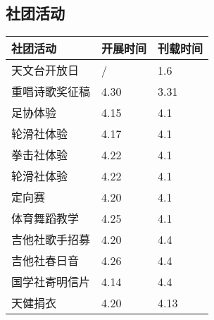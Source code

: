 \documentclass[letterpaper, 12pt]{article}
\begin{document}
\begin{multicols}{2}
\section{社团活动}
\begin{tabular}{|>{\centering\arraybackslash}m{}|m{}|m{}|}
    \hline
    社团活动 & 开展时间 & 刊载时间\\
    \hline\hline
    天文台开放日 & / & 1.6\\
    重唱诗歌奖征稿 & 4.30 & 3.31\\
    足协体验 & 4.15 & 4.1\\
    轮滑社体验 & 4.17 & 4.1\\
    拳击社体验 & 4.22 & 4.1\\
    轮滑社体验 & 4.22 & 4.1\\
    定向赛 & 4.20 & 4.1\\
    体育舞蹈教学 & 4.25 & 4.1\\
    吉他社歌手招募 & 4.20 & 4.4\\
    吉他社春日音 & 4.26 & 4.4\\
    国学社寄明信片 & 4.14 & 4.4\\
    天健捐衣 & 4.20 & 4.13\\
    \hline
\end{tabular}


\end{multicols}
\end{document}
